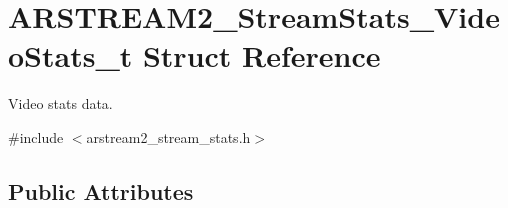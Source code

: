 \hypertarget{struct_a_r_s_t_r_e_a_m2___stream_stats___video_stats__t}{}\section{A\+R\+S\+T\+R\+E\+A\+M2\+\_\+\+Stream\+Stats\+\_\+\+Video\+Stats\+\_\+t Struct Reference}
\label{struct_a_r_s_t_r_e_a_m2___stream_stats___video_stats__t}


Video stats data.  




{\ttfamily \#include $<$arstream2\+\_\+stream\+\_\+stats.\+h$>$}

\subsection*{Public Attributes}
